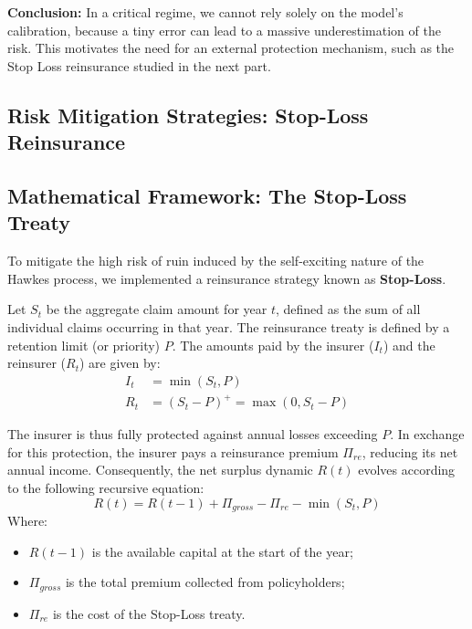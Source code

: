 \documentclass[a4paper,11pt]{article}
\begin{document}
\textbf{Conclusion:} In a critical regime, we cannot rely solely on the model's calibration, because a tiny error can lead to a massive underestimation of the risk. This motivates the need for an external protection mechanism, such as the Stop Loss reinsurance studied in the next part.

\subsection{Risk Mitigation Strategies: Stop-Loss Reinsurance}

\subsection*{Mathematical Framework: The Stop-Loss Treaty}
To mitigate the high risk of ruin induced by the self-exciting nature of the Hawkes process, we implemented a reinsurance strategy known as \textbf{Stop-Loss}. 

Let $S_t$ be the aggregate claim amount for year $t$, defined as the sum of all individual claims occurring in that year. The reinsurance treaty is defined by a retention limit (or priority) $P$. The amounts paid by the insurer ($I_t$) and the reinsurer ($R_t$) are given by:
\begin{equation}
    \begin{aligned}
        I_t &= \min(S_t, P) \\
        R_t &= (S_t - P)^+ = \max(0, S_t - P)
    \end{aligned}
\end{equation}

The insurer is thus fully protected against annual losses exceeding $P$. In exchange for this protection, the insurer pays a reinsurance premium $\Pi_{re}$, reducing its net annual income. Consequently, the net surplus dynamic $R(t)$ evolves according to the following recursive equation:
\begin{equation}
    R(t) = R(t-1) + \Pi_{gross} - \Pi_{re} - \min(S_t, P)
\end{equation}
Where:
\begin{itemize}
    \item $R(t-1)$ is the available capital at the start of the year;
    \item $\Pi_{gross}$ is the total premium collected from policyholders;
    \item $\Pi_{re}$ is the cost of the Stop-Loss treaty.
\end{itemize}
\end{document}
